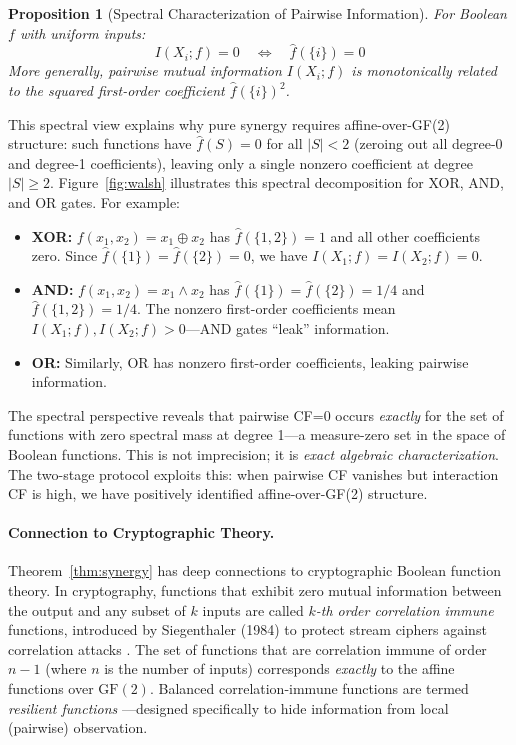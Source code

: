 \documentclass[10pt]{article} %
\theoremstyle{plain}
\newtheorem{proposition}[theorem]{Proposition}
\theoremstyle{definition}
\begin{document}
\begin{proposition}[Spectral Characterization of Pairwise Information]
For Boolean $f$ with uniform inputs:
\begin{equation}
I(X_i; f) = 0 \quad \Leftrightarrow \quad \hat{f}(\{i\}) = 0
\end{equation}
More generally, pairwise mutual information $I(X_i; f)$ is monotonically related to the squared first-order coefficient $\hat{f}(\{i\})^2$.
\end{proposition}

\noindent This spectral view explains why pure synergy requires affine-over-GF(2) structure: such functions have $\hat{f}(S) = 0$ for all $|S| < 2$ (zeroing out all degree-0 and degree-1 coefficients), leaving only a single nonzero coefficient at degree $|S| \geq 2$. Figure~\ref{fig:walsh} illustrates this spectral decomposition for XOR, AND, and OR gates. For example:
\begin{itemize}
    \item \textbf{XOR:} $f(x_1, x_2) = x_1 \oplus x_2$ has $\hat{f}(\{1,2\}) = 1$ and all other coefficients zero. Since $\hat{f}(\{1\}) = \hat{f}(\{2\}) = 0$, we have $I(X_1; f) = I(X_2; f) = 0$.
    \item \textbf{AND:} $f(x_1, x_2) = x_1 \land x_2$ has $\hat{f}(\{1\}) = \hat{f}(\{2\}) = 1/4$ and $\hat{f}(\{1,2\}) = 1/4$. The nonzero first-order coefficients mean $I(X_1; f), I(X_2; f) > 0$---AND gates ``leak'' information.
    \item \textbf{OR:} Similarly, OR has nonzero first-order coefficients, leaking pairwise information.
\end{itemize}

\noindent The spectral perspective reveals that pairwise CF=0 occurs \emph{exactly} for the set of functions with zero spectral mass at degree 1---a measure-zero set in the space of Boolean functions. This is not imprecision; it is \emph{exact algebraic characterization}. The two-stage protocol exploits this: when pairwise CF vanishes but interaction CF is high, we have positively identified affine-over-GF(2) structure.

\paragraph{Connection to Cryptographic Theory.} Theorem~\ref{thm:synergy} has deep connections to cryptographic Boolean function theory. In cryptography, functions that exhibit zero mutual information between the output and any subset of $k$ inputs are called \emph{$k$-th order correlation immune} functions, introduced by Siegenthaler (1984) to protect stream ciphers against correlation attacks \citep{siegenthaler1984correlation}. The set of functions that are correlation immune of order $n-1$ (where $n$ is the number of inputs) corresponds \emph{exactly} to the affine functions over $\text{GF}(2)$. Balanced correlation-immune functions are termed \emph{resilient functions} \citep{chor1985resilient}---designed specifically to hide information from local (pairwise) observation.
\end{document}
